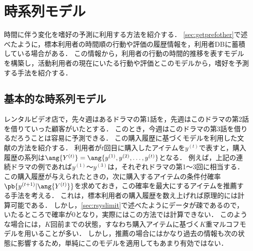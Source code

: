 
\section{時系列モデル}
\label{sec:timeseries}

時間に伴う変化を嗜好の予測に利用する方法を紹介する．
\ref{sec:getprefother}で述べたように，標本利用者の時間順の行動や評価の履歴情報を，利用者DBに蓄積している場合がある．
この情報から，利用者の行動の時間的推移を表すモデルを構築し，活動利用者の現在にいたる行動や評価とこのモデルから，嗜好を予測する手法を紹介する．

\subsection{基本的な時系列モデル}

レンタルビデオ店で，先々週はあるドラマの第1話を，先週はこのドラマの第2話を借りていった顧客がいたとする．
このとき，今週はこのドラマの第3話を借りるだろうことは容易に予測できる．
この購入履歴に基づくモデルを利用した文献\cite{nips:03:03}の方法を紹介する．
利用者が$t$回目に購入したアイテムを$y^{(t)}$で表すと，購入履歴の系列は$\ang{Y^{(t)}}=\ang{y^{(1)},y^{(2)},\ldots,y^{(t)}}$となる．
例えば，上記の連続ドラマの例であれば$y^{(1)}$〜$y^{(3)}$は，それぞれドラマの第1〜3回に相当する．
この購入履歴が与えられたときの，次に購入するアイテムの条件付確率$\pb{y^{(t+1)}|\ang{Y^{(t)}}}$を求めておき，この確率を最大にするアイテムを推薦する手法を考える．
これは，標本利用者の購入履歴を数え上げれば原理的には計算可能である．
しかし，\ref{sec:rsyslimit}で述べたようにデータが疎であるので，いたるところで確率が$0$となり，実際にはこの方法では計算できない．
このような場合には，$K$回前までの状態，すなわち購入アイテムに基づく$K$重マルコフモデルを用いることが多い．
しかし，推薦の場合にはかなり過去の情報も次の状態に影響するため，単純にこのモデルを適用してもあまり有効ではない．

